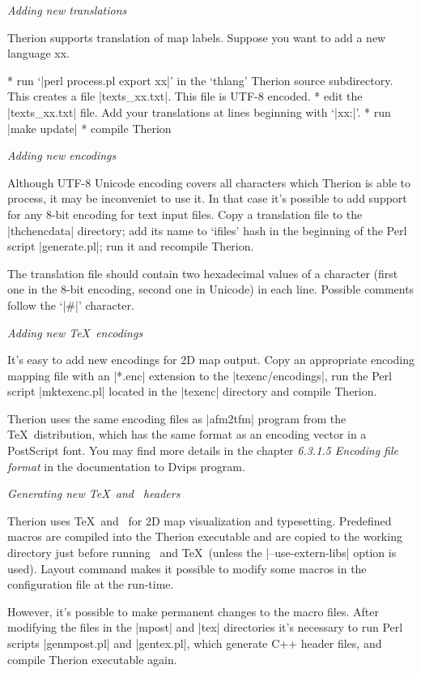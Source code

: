 {\it Adding new translations}

Therion supports translation of map labels. 
Suppose you want to add a new language xx. 

\list
* run `|perl process.pl export xx|' in the `thlang' Therion source subdirectory. 
  This creates a file |texts_xx.txt|. This file is UTF-8 encoded.
* edit the |texts_xx.txt| file. Add your translations at lines beginning with
  `|xx:|'.
* run |make update|
* compile Therion
\endlist


{\it Adding new encodings}

Although UTF-8 Unicode encoding covers all characters which Therion is able to 
process, it may be inconveniet to use it. In that case it's possible to add 
support for any 8-bit encoding for text input files. Copy a translation file to 
the |thchencdata| directory; add its name to `ifiles' hash in the beginning of 
the Perl script |generate.pl|; run it and recompile Therion.

The translation file should contain two hexadecimal values of a character 
(first one in the 8-bit encoding, second one in Unicode) in each line. Possible 
comments follow the `|#|' character. 

{\it Adding new \TeX\ encodings}

It's easy to add new encodings for 2D map output. Copy an appropriate encoding 
mapping file with an |*.enc| extension to the |texenc/encodings|, run the Perl 
script |mktexenc.pl| located in the |texenc| directory and compile Therion.

Therion uses the same encoding files as |afm2tfm| program from the \TeX\ 
distribution, which has the same format as an encoding vector in a PostScript 
font. You may find more details in the chapter {\it 6.3.1.5 Encoding file 
format} in the documentation to Dvips program.


{\it Generating new \TeX\ and \MP\ headers}

Therion uses \TeX\ and \MP\ for 2D map visualization and typesetting. 
Predefined macros are compiled into the Therion executable and are copied to 
the working directory just before running \MP\ and \TeX\ (unless the 
|--use-extern-libs| option is used). Layout command makes it possible to modify 
some macros in the configuration file at the run-time. 

However, it's possible to make permanent changes to the macro files. After 
modifying the files in the |mpost| and |tex| directories it's necessary to run 
Perl scripts |genmpost.pl| and |gentex.pl|, which generate C++ header files, 
and compile Therion executable again.

